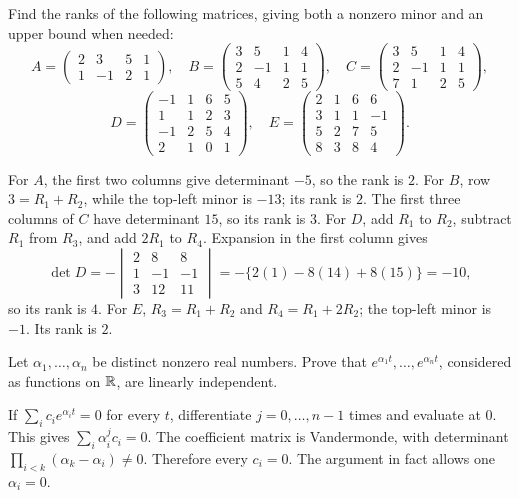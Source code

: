 \begin{problem}\label{ex:07:rank}
Find the ranks of the following matrices, giving both a nonzero minor
and an upper bound when needed:
\[
 A=\begin{pmatrix}2&3&5&1\\1&-1&2&1\end{pmatrix},\quad
 B=\begin{pmatrix}3&5&1&4\\2&-1&1&1\\5&4&2&5\end{pmatrix},
 \quad C=\begin{pmatrix}3&5&1&4\\2&-1&1&1\\7&1&2&5\end{pmatrix},
\]
\[
 D=\begin{pmatrix}-1&1&6&5\\1&1&2&3\\-1&2&5&4\\2&1&0&1\end{pmatrix},
 \quad E=\begin{pmatrix}2&1&6&6\\3&1&1&-1\\5&2&7&5\\8&3&8&4\end{pmatrix}.
\]
\end{problem}
\begin{solution}
For \(A\), the first two columns give determinant \(-5\), so the rank is
\(2\). For \(B\), row \(3=R_1+R_2\), while the top-left minor is
\(-13\); its rank is \(2\). The first three columns of \(C\) have
determinant \(15\), so its rank is \(3\).
For \(D\), add \(R_1\) to \(R_2\), subtract \(R_1\) from \(R_3\), and
add \(2R_1\) to \(R_4\). Expansion in the first column gives
\[
 \det D=-\begin{vmatrix}2&8&8\\1&-1&-1\\3&12&11\end{vmatrix}
 =-\{2(1)-8(14)+8(15)\}=-10,
\]
so its rank is \(4\).
For \(E\), \(R_3=R_1+R_2\) and \(R_4=R_1+2R_2\);
the top-left minor is \(-1\). Its rank is \(2\).
\end{solution}

\begin{problem}\label{ex:07:exponentials}
Let \(\alpha_1,\ldots,\alpha_n\) be distinct nonzero real numbers.
Prove that \(e^{\alpha_1t},\ldots,e^{\alpha_nt}\), considered as functions
on \(\mathbb R\), are linearly independent.
\end{problem}
\begin{solution}
If \(\sum_i c_i e^{\alpha_it}=0\) for every \(t\), differentiate
\(j=0,\ldots,n-1\) times and evaluate at \(0\). This gives
\(\sum_i\alpha_i^j c_i=0\). The coefficient matrix is Vandermonde,
with determinant \(\prod_{i<k}(\alpha_k-\alpha_i)\ne0\).
Therefore every \(c_i=0\). The argument in fact allows one \(\alpha_i=0\).
\end{solution}

